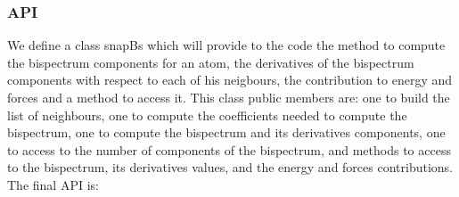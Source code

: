\documentclass[12pt]{article}
\begin{document}
      \subsubsection{API}

We define a class snapBs which will provide to the code the method to compute the bispectrum components for an atom, the derivatives of the bispectrum components with respect to each of his neigbours, the contribution to energy and forces and a method to access it. This class public members are: one to build the list of neighbours, one to compute the coefficients needed to compute the bispectrum, one to compute the bispectrum and its derivatives components, one to access to the number of components of the bispectrum, and methods to access to the bispectrum, its derivatives values, and the energy and forces contributions. The final API is:
\end{document}
